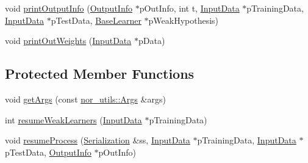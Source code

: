 \begin{DoxyCompactItemize}
\item 
void \hyperlink{classMultiBoost_1_1AdaBoostMHLearner_a2bde373d5f80a4fd57b7de09e8ef327b}{print\-Output\-Info} (\hyperlink{classMultiBoost_1_1OutputInfo}{Output\-Info} $\ast$p\-Out\-Info, int t, \hyperlink{classMultiBoost_1_1InputData}{Input\-Data} $\ast$p\-Training\-Data, \hyperlink{classMultiBoost_1_1InputData}{Input\-Data} $\ast$p\-Test\-Data, \hyperlink{classMultiBoost_1_1BaseLearner}{Base\-Learner} $\ast$p\-Weak\-Hypothesis)
\item 
void \hyperlink{classMultiBoost_1_1AdaBoostMHLearner_aab49c681fb8c5eee29f346a46c2a5e29}{print\-Out\-Weights} (\hyperlink{classMultiBoost_1_1InputData}{Input\-Data} $\ast$p\-Data)
\end{DoxyCompactItemize}
\subsection*{Protected Member Functions}
\begin{DoxyCompactItemize}
\item 
void \hyperlink{classMultiBoost_1_1AdaBoostMHLearner_a45075e518fae57257fd9cfb8535060b1}{get\-Args} (const \hyperlink{classnor__utils_1_1Args}{nor\-\_\-utils\-::\-Args} \&args)
\item 
int \hyperlink{classMultiBoost_1_1AdaBoostMHLearner_af13c90ad8fc53b88d1f20e8d52ba0049}{resume\-Weak\-Learners} (\hyperlink{classMultiBoost_1_1InputData}{Input\-Data} $\ast$p\-Training\-Data)
\item 
void \hyperlink{classMultiBoost_1_1AdaBoostMHLearner_adf47da0cc22df7ebc55170dfea933203}{resume\-Process} (\hyperlink{classMultiBoost_1_1Serialization}{Serialization} \&ss, \hyperlink{classMultiBoost_1_1InputData}{Input\-Data} $\ast$p\-Training\-Data, \hyperlink{classMultiBoost_1_1InputData}{Input\-Data} $\ast$p\-Test\-Data, \hyperlink{classMultiBoost_1_1OutputInfo}{Output\-Info} $\ast$p\-Out\-Info)
\end{DoxyCompactItemize}
